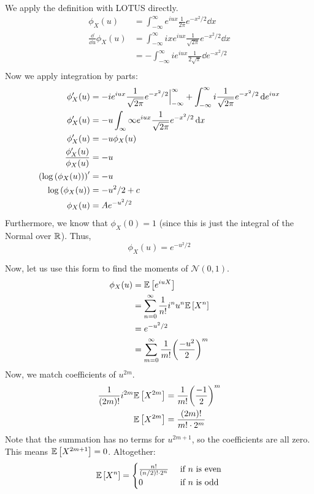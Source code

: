 \begin{example}
    We apply the definition with LOTUS directly.
    \begin{align*}
        \phi_X(u) &= \int_{-\infty}^{\infty} e^{iux} \frac{1}{2 \pi}  e^{-x^2/2} \dd{x} \\
        \frac{\dd}{\dd{u}} \phi_X(u) &= \int_{-\infty}^{\infty} ix e^{iux} \frac{1}{\sqrt{2\pi}} e^{-x^2/2} \dd{x} \\
        &= - \int_{-\infty}^{\infty} ie^{iux} \frac{1}{2\sqrt{\pi}} \dd{e^{-x^2/2}} \\
    \end{align*}
    Now we apply integration by parts:
    \begin{align*}
        \phi'_X(u) &= -ie^{iux} \frac{1}{\sqrt{2 \pi}} e^{-x^2/2} \Big|_{-\infty}^{\infty} + \int_{-\infty}^{\infty} i \frac{1}{\sqrt{2\pi}} e^{-x^2/2} \dd{e^{iux}} \\
        \phi'_X(u) &= -u \int_{\infty}{\infty} e^{iux} \frac{1}{\sqrt{2\pi}} e^{-x^2/2} \dd{x} \\
        \phi'_X(u) &= -u \phi_X(u) \\
        \frac{\phi'_X(u)}{\phi_X(u)} &= -u \\
        \qty(\log\qty(\phi_X(u)))' &= -u \\
        \log\qty(\phi_X(u)) &= -u^2/2 + c \\
        \phi_X(u) &= Ae^{-u^2/2} \\
    \end{align*}
    Furthermore, we know that $\phi_X(0) = 1$ (since this is just the integral of the Normal over $\operatorname{\mathbb{R}}$). Thus,
    \[ \phi_X(u) = e^{-u^2/2} \]

    Now, let us use this form to find the moments of $\mathcal{N}(0, 1)$.
    \begin{align*}
        \phi_X(u) &= \mathbb{E}\left[ e^{iuX} \right] \\
        &= \sum_{n = 0}^{\infty} \frac{1}{n!} i^n u^n \mathbb{E}\left[ X^n \right] \\
        &= e^{-u^2/2} \\
        &= \sum_{m = 0}^{\infty} \frac{1}{m!} \qty(\frac{-u^2}{2})^m
    \end{align*}
    Now, we match coefficients of $u^{2m}$.
    \begin{align*}
        \frac{1}{\qty(2m)!} i^{2m} \mathbb{E}\left[ X^{2m} \right] &= \frac{1}{m!} \qty(\frac{-1}{2})^m \\
        \mathbb{E}\left[ X^{2m} \right] &= \frac{(2m)!}{m! \cdot 2^m}
    \end{align*}
    Note that the summation has no terms for $u^{2m + 1}$, so the coefficients are all zero.
    This means $\mathbb{E}\left[ X^{2m + 1} \right] = 0$. Altogether:
    \[ \mathbb{E}\left[ X^n \right] = \begin{cases}
        \frac{n!}{(n/2)! \cdot 2^n} & \text{ if $n$ is even} \\
        0 & \text{ if $n$ is odd}
    \end{cases} \]
\end{example}


